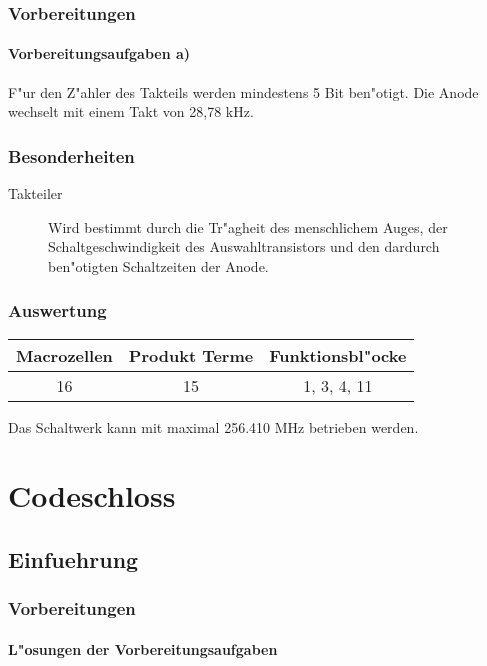 \documentclass [] {scrartcl}
\begin{document}
  \subsubsection{Vorbereitungen}
  \paragraph{Vorbereitungsaufgaben a)}
  F"ur den Z"ahler des Takteils werden mindestens 5 Bit ben"otigt. Die Anode wechselt mit einem Takt von 28,78 kHz.
  \subsubsection{Besonderheiten}
  \begin{description}
    \item[Takteiler] Wird bestimmt durch die Tr"agheit des menschlichem Auges, der Schaltgeschwindigkeit des Auswahltransistors und den dardurch ben"otigten Schaltzeiten der Anode.
  \end{description}
  \subsubsection{Auswertung}

  \begin{table}[h]
    \begin{tabular}{c|c|c}
      Macrozellen & Produkt Terme & Funktionsbl"ocke\\
      \hline
      16 & 15 & 1, 3, 4, 11\\
    \end{tabular}
  \end{table}
  Das Schaltwerk kann mit maximal 256.410 MHz betrieben werden.

  \section{Codeschloss}
  \subsection{Einfuehrung}
  \subsubsection{Vorbereitungen}
  \paragraph{L"osungen der Vorbereitungsaufgaben}
\end{document}
